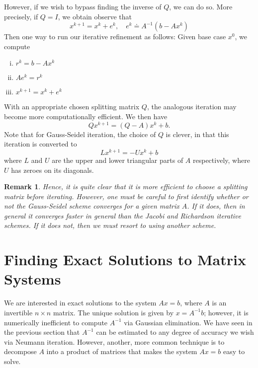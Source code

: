 \documentclass[12pt,reqno]{amsart}
\numberwithin{equation}{section}  %
\newtheorem{remark}[theorem]{Remark}
\begin{document}
However, if we wish to bypass finding the inverse of $Q$, we can do so. More precisely, if
$Q = I$, we obtain
observe that
\begin{equation*}
x^{k+1} = x^{k} + e^{k}, \quad e^{k} \doteq A^{-1}(b - Ax^{k})
\end{equation*}
Then one way to run our iterative refinement as follows: Given base case $x^{0}$, we compute 
\begin{enumerate}[i)]
\item $r^{k} = b - Ax^{k}$
\item $Ae^{k} = r^{k}$
\item $x^{k+1} = x^{k} + e^{k}$
\end{enumerate}
With an appropriate chosen splitting matrix $Q$, the analogous iteration may become
more computationally efficient. We then have
\begin{equation*}
Qx^{k+1} = (Q - A)x^{k} + b.
\end{equation*}
Note that for Gauss-Seidel iteration, the choice of $Q$ is clever, in that this
iteration  is converted to 
\begin{equation*}
L x^{k+1} = - U x^{k} + b
\end{equation*}
where $L$ and $U$ are the upper and lower triangular parts of $A$ respectively,
where $U$ has zeroes on its diagonals. 

\begin{remark}
Hence, it is quite clear that it is more efficient to choose a splitting matrix
before iterating. However, one must be careful to first identify whether or not
the Gauss-Seidel scheme converges for a given matrix $A$. If it does, then in
general it converges faster in general than the Jacobi and Richardson iterative
schemes. If it does not, then we must resort to using another scheme.
\end{remark}
\section{Finding Exact Solutions to Matrix Systems}
We are interested in exact solutions to the system $Ax = b$, 
where $A$ is an invertible $n \times n$ matrix. The unique solution
is given by $x = A^{-1}b$; however, it is numerically inefficient
to compute $A^{-1}$ via Gaussian elimination. We have seen in the previous
section that $A^{-1}$ can be estimated to any degree of accuracy we wish
via Neumann iteration. However, another, more common technique is 
to decompose $A$ into a product of matrices that makes the system $Ax = b$
easy to solve. 
\end{document}
